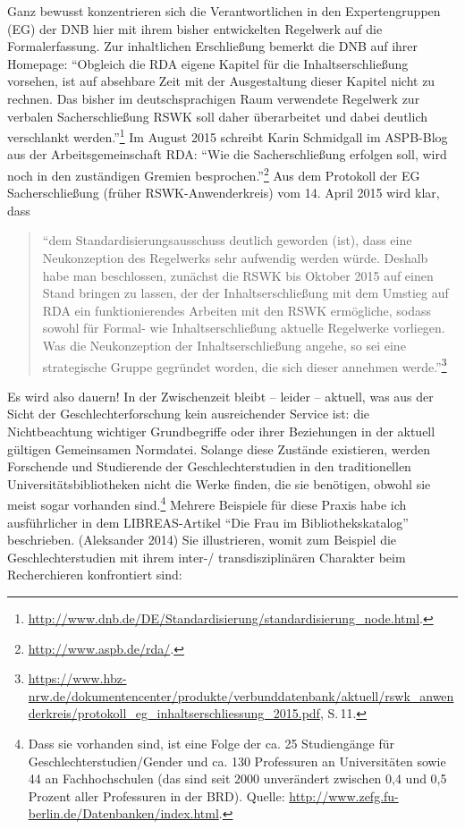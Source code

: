 Ganz bewusst konzentrieren sich die Verantwortlichen in den
Expertengruppen (EG) der DNB hier mit ihrem bisher entwickelten
Regelwerk auf die Formalerfassung. Zur inhaltlichen Erschließung bemerkt
die DNB auf ihrer Homepage: \enquote{Obgleich die RDA eigene Kapitel für
die Inhaltserschließung vorsehen, ist auf absehbare Zeit mit der
Ausgestaltung dieser Kapitel nicht zu rechnen. Das bisher im
deutschsprachigen Raum verwendete Regelwerk zur verbalen
Sacherschließung RSWK soll daher überarbeitet und dabei deutlich
verschlankt werden.}\footnote{\url{http://www.dnb.de/DE/Standardisierung/standardisierung_node.html}.}
Im August 2015 schreibt Karin Schmidgall im ASPB-Blog aus der
Arbeitsgemeinschaft RDA: \enquote{Wie die Sacherschließung erfolgen
soll, wird noch in den zuständigen Gremien besprochen.}\footnote{\url{http://www.aspb.de/rda/}.}
Aus dem Protokoll der EG Sacherschließung (früher RSWK-Anwenderkreis)
vom 14. April 2015 wird klar, dass

\begin{quote}
\enquote{dem Standardisierungsausschuss deutlich geworden (ist), dass
eine Neukonzeption des Regelwerks sehr aufwendig werden würde. Deshalb
habe man beschlossen, zunächst die RSWK bis Oktober 2015 auf einen Stand
bringen zu lassen, der der Inhaltserschließung mit dem Umstieg auf RDA
ein funktionierendes Arbeiten mit den RSWK ermögliche, sodass sowohl für
Formal- wie Inhaltserschließung aktuelle Regelwerke vorliegen. Was die
Neukonzeption der Inhaltserschließung angehe, so sei eine strategische
Gruppe gegründet worden, die sich dieser annehmen werde.}\footnote{\url{https://www.hbz-nrw.de/dokumentencenter/produkte/verbunddatenbank/aktuell/rswk_anwenderkreis/protokoll_eg_inhaltserschliessung_2015.pdf},
  S.\,11.}
\end{quote}

Es wird also dauern! In der Zwischenzeit bleibt -- leider -- aktuell,
was aus der Sicht der Geschlechterforschung kein ausreichender Service
ist: die Nichtbeachtung wichtiger Grundbegriffe oder ihrer Beziehungen
in der aktuell gültigen Gemeinsamen Normdatei. Solange diese Zustände
existieren, werden Forschende und Studierende der Geschlechterstudien in
den traditionellen Universitätsbibliotheken nicht die Werke finden, die
sie benötigen, obwohl sie meist sogar vorhanden sind.\footnote{Dass sie
  vorhanden sind, ist eine Folge der ca. 25 Studiengänge für
  Geschlechterstudien/Gender und ca. 130 Professuren an Universitäten
  sowie 44 an Fachhochschulen (das sind seit 2000 unverändert zwischen
  0,4 und 0,5 Prozent aller Professuren in der BRD). Quelle:
  \url{http://www.zefg.fu-berlin.de/Datenbanken/index.html}.} Mehrere
Beispiele für diese Praxis habe ich ausführlicher in dem LIBREAS-Artikel
\enquote{Die Frau im Bibliothekskatalog} beschrieben. (Aleksander 2014)
Sie illustrieren, womit zum Beispiel die Geschlechterstudien mit ihrem
inter-/ transdisziplinären Charakter beim Recherchieren konfrontiert
sind:

